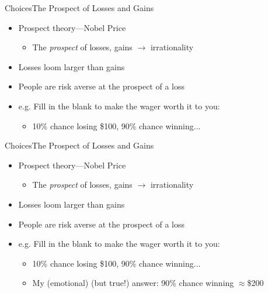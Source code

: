 \documentclass{beamer}
\begin{document}
\begin{frame}{Choices}{The Prospect of Losses and Gains}
  \begin{itemize}
  \addtolength{\itemsep}{0.5\baselineskip}
  \item Prospect theory---Nobel Price
        \begin{itemize}
        \item The {\it prospect} of losses, gains $\rightarrow$ irrationality
        \end{itemize}
  \item Losses loom larger than gains
  \item People are risk averse at the prospect of a loss
  \item e.g. Fill in the blank to make the wager worth it to you:
        \begin{itemize}
        \item 10\% chance losing \$100, 90\% chance winning...
        \end{itemize}
  \end{itemize}
\end{frame}

\begin{frame}{Choices}{The Prospect of Losses and Gains}
  \begin{itemize}
  \addtolength{\itemsep}{0.5\baselineskip}
  \item Prospect theory---Nobel Price
        \begin{itemize}
        \item The {\it prospect} of losses, gains $\rightarrow$ irrationality
        \end{itemize}
  \item Losses loom larger than gains
  \item People are risk averse at the prospect of a loss
  \item e.g. Fill in the blank to make the wager worth it to you:
        \begin{itemize}
        \addtolength{\itemsep}{0.5\baselineskip}
        \item 10\% chance losing \$100, 90\% chance winning...
        \item My (emotional) (but true!) answer: 90\% chance winning $\approx$\$200
        \end{itemize}
  \end{itemize}
\end{frame}
\end{document}
